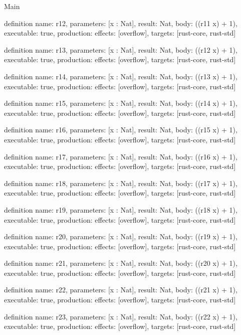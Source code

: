 \begin{lexlean}{Main}
\begin{semanticmodule}
definition{
  name: r12,
  parameters: [x : Nat],
  result: Nat,
  body: ((r11 x) + 1),
  executable: true,
  production: {effects: [overflow], targets: [rust-core, rust-std]}
}

definition{
  name: r13,
  parameters: [x : Nat],
  result: Nat,
  body: ((r12 x) + 1),
  executable: true,
  production: {effects: [overflow], targets: [rust-core, rust-std]}
}

definition{
  name: r14,
  parameters: [x : Nat],
  result: Nat,
  body: ((r13 x) + 1),
  executable: true,
  production: {effects: [overflow], targets: [rust-core, rust-std]}
}

definition{
  name: r15,
  parameters: [x : Nat],
  result: Nat,
  body: ((r14 x) + 1),
  executable: true,
  production: {effects: [overflow], targets: [rust-core, rust-std]}
}

definition{
  name: r16,
  parameters: [x : Nat],
  result: Nat,
  body: ((r15 x) + 1),
  executable: true,
  production: {effects: [overflow], targets: [rust-core, rust-std]}
}

definition{
  name: r17,
  parameters: [x : Nat],
  result: Nat,
  body: ((r16 x) + 1),
  executable: true,
  production: {effects: [overflow], targets: [rust-core, rust-std]}
}

definition{
  name: r18,
  parameters: [x : Nat],
  result: Nat,
  body: ((r17 x) + 1),
  executable: true,
  production: {effects: [overflow], targets: [rust-core, rust-std]}
}

definition{
  name: r19,
  parameters: [x : Nat],
  result: Nat,
  body: ((r18 x) + 1),
  executable: true,
  production: {effects: [overflow], targets: [rust-core, rust-std]}
}

definition{
  name: r20,
  parameters: [x : Nat],
  result: Nat,
  body: ((r19 x) + 1),
  executable: true,
  production: {effects: [overflow], targets: [rust-core, rust-std]}
}

definition{
  name: r21,
  parameters: [x : Nat],
  result: Nat,
  body: ((r20 x) + 1),
  executable: true,
  production: {effects: [overflow], targets: [rust-core, rust-std]}
}

definition{
  name: r22,
  parameters: [x : Nat],
  result: Nat,
  body: ((r21 x) + 1),
  executable: true,
  production: {effects: [overflow], targets: [rust-core, rust-std]}
}

definition{
  name: r23,
  parameters: [x : Nat],
  result: Nat,
  body: ((r22 x) + 1),
  executable: true,
  production: {effects: [overflow], targets: [rust-core, rust-std]}
}


\end{semanticmodule}
\end{lexlean}
